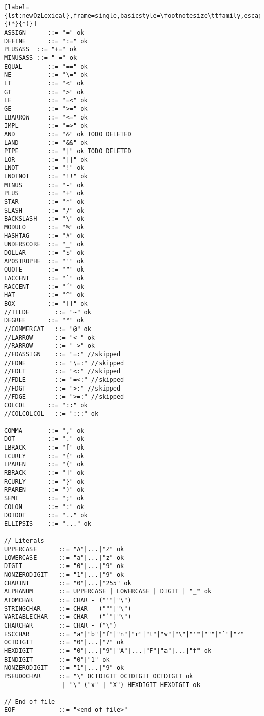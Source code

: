 \begin{lstlisting}[label={lst:newOzLexical},frame=single,basicstyle=\footnotesize\ttfamily,escapeinside={(*}{*)}]
ASSIGN      ::= "=" ok
DEFINE      ::= ":=" ok
PLUSASS  ::= "+=" ok
MINUSASS ::= "-=" ok
EQUAL       ::= "==" ok
NE          ::= "\=" ok
LT          ::= "<" ok
GT          ::= ">" ok
LE          ::= "=<" ok
GE          ::= ">=" ok
LBARROW     ::= "<=" ok
IMPL        ::= "=>" ok
AND         ::= "&" ok TODO DELETED
LAND        ::= "&&" ok
PIPE        ::= "|" ok TODO DELETED
LOR         ::= "||" ok
LNOT        ::= "!" ok
LNOTNOT     ::= "!!" ok
MINUS       ::= "-" ok
PLUS        ::= "+" ok
STAR        ::= "*" ok
SLASH       ::= "/" ok
BACKSLASH   ::= "\" ok
MODULO      ::= "%" ok
HASHTAG     ::= "#" ok
UNDERSCORE  ::= "_" ok
DOLLAR      ::= "$" ok
APOSTROPHE  ::= "'" ok
QUOTE       ::= """ ok
LACCENT     ::= "`" ok
RACCENT     ::= "´" ok
HAT         ::= "^" ok
BOX         ::= "[]" ok
//TILDE       ::= "~" ok
DEGREE      ::= "°" ok
//COMMERCAT   ::= "@" ok
//LARROW      ::= "<-" ok
//RARROW      ::= "->" ok
//FDASSIGN    ::= "=:" //skipped
//FDNE        ::= "\=:" //skipped
//FDLT        ::= "<:" //skipped
//FDLE        ::= "=<:" //skipped
//FDGT        ::= ">:" //skipped
//FDGE        ::= ">=:" //skipped
COLCOL      ::= "::" ok
//COLCOLCOL   ::= ":::" ok

COMMA       ::= "," ok
DOT         ::= "." ok
LBRACK      ::= "[" ok
LCURLY      ::= "{" ok
LPAREN      ::= "(" ok
RBRACK      ::= "]" ok
RCURLY      ::= "}" ok
RPAREN      ::= ")" ok
SEMI        ::= ";" ok
COLON       ::= ":" ok
DOTDOT      ::= ".." ok
ELLIPSIS    ::= "..." ok

// Literals
UPPERCASE      ::= "A"|...|"Z" ok
LOWERCASE      ::= "a"|...|"z" ok
DIGIT          ::= "0"|...|"9" ok
NONZERODIGIT   ::= "1"|...|"9" ok
CHARINT        ::= "0"|...|"255" ok
ALPHANUM       ::= UPPERCASE | LOWERCASE | DIGIT | "_" ok
ATOMCHAR       ::= CHAR - ("'"|"\")
STRINGCHAR     ::= CHAR - ("""|"\")
VARIABLECHAR   ::= CHAR - ("`"|"\")
CHARCHAR       ::= CHAR - ("\")
ESCCHAR        ::= "a"|"b"|"f"|"n"|"r"|"t"|"v"|"\"|"'"|"""|"`"|"°"
OCTDIGIT       ::= "0"|...|"7" ok
HEXDIGIT       ::= "0"|...|"9"|"A"|...|"F"|"a"|...|"f" ok
BINDIGIT       ::= "0"|"1" ok
NONZERODIGIT   ::= "1"|...|"9" ok
PSEUDOCHAR     ::= "\" OCTDIGIT OCTDIGIT OCTDIGIT ok
                | "\" ("x" | "X") HEXDIGIT HEXDIGIT ok

// End of file
EOF            ::= "<end of file>"

\end{lstlisting}